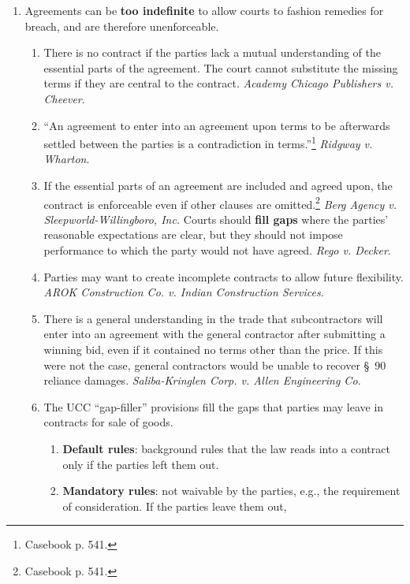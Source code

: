 \begin{enumerate}
    \item Agreements can be \textbf{too indefinite} to allow courts to fashion 
    remedies for breach, and are therefore unenforceable.
    \begin{enumerate}
        \item There is no contract if the parties lack a mutual understanding 
        of the essential parts of the agreement. The court cannot substitute 
        the missing terms if they are central to the contract. \emph{Academy 
        Chicago Publishers v. Cheever}. 
        \item ``An agreement to enter into an agreement upon terms to be 
        afterwards settled between the parties is a contradiction in 
        terms.''\footnote{Casebook p. 541.} \emph{Ridgway v. Wharton}.
        \item If the essential parts of an agreement are included and agreed 
        upon, the contract is enforceable even if other clauses are 
        omitted.\footnote{Casebook p. 541.} \emph{Berg Agency v. 
        Sleepworld-Willingboro, Inc.} Courts should \textbf{fill gaps} where 
        the parties' reasonable expectations are clear, but they should not 
        impose performance to which the party would not have agreed. 
        \emph{Rego v. Decker}.
        \item Parties may want to create incomplete contracts to allow future 
        flexibility. \emph{AROK Construction Co. v. Indian Construction 
        Services}.
        \item There is a general understanding in the trade that 
        subcontractors will enter into an agreement with the general 
        contractor after submitting a winning bid, even if it contained no 
        terms other than the price. If this were not the case, general 
        contractors would be unable to recover \S\ 90 reliance damages. 
        \emph{Saliba-Kringlen Corp. v. Allen Engineering Co.}
        \item The UCC ``gap-filler'' provisions fill the gaps that parties may 
        leave in contracts for sale of goods.
        \begin{enumerate}
            \item \textbf{Default rules}: background rules that the law reads 
            into a contract only if the parties left them out.
            \item \textbf{Mandatory rules}: not waivable by the parties, e.g., 
            the requirement of consideration. If the parties leave them out, 

\end{enumerate}
\end{enumerate}
\end{enumerate}
